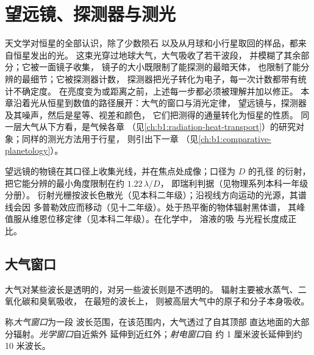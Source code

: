 \chapter{望远镜、探测器与测光}\label{ch:b1:observing-the-sky}

天文学对恒星的全部认识，除了少数陨石
以及从月球和小行星取回的样品，都来自恒星发出的光。
这束光穿过地球大气，大气吸收了若干波段，
并模糊了其余部分；它被一面镜子收集，
镜子的大小既限制了能探测的最暗天体，
也限制了能分辨的最细节；它被探测器计数，
探测器把光子转化为电子，每一次计数都带有统计不确定度。
在亮度变为或距离之前，上述每一步都必须被理解并加以修正。
本章沿着光从恒星到数值的路径展开：大气的窗口与消光定律，
望远镜与，探测器及其噪声，然后是星等、视差和颜色，
它们把测得的通量转化为恒星的性质。
同一层大气从下方看，是气候各章
（见\cref{ch:b1:radiation-heat-transport}）的研究对象；同样的测光方法用于行星，
则引出下一章
（见\cref{ch:b1:comparative-planetology}）。

\begin{recall}
望远镜的物镜在其口径上收集光线，并在焦点处成像；口径为 $D$ 的孔径
的衍射，把它能分辨的最小角度限制在约 $1.22\,\lambda/D$，
即瑞利判据（见物理系列本科一年级分册）。
衍射光栅按波长色散光（见本科二年级）；沿视线方向运动的光源，其谱线会因
多普勒效应而移动（见十二年级）。处于热平衡的物体辐射黑体谱，
其峰值服从维恩位移定律（见本科二年级）。在化学中，
溶液的吸
与光程长度成正比。
\end{recall}

\section{大气窗口}

大气对某些波长是透明的，对另一些波长则是不透明的。
辐射主要被水蒸气、二氧化碳和臭氧吸收，
在最短的波长上，
则被高层大气中的原子和分子本身吸收。

\begin{definition}[大气窗口]\label{def:b1:observing-the-sky:window}
称\emph{大气窗口}为一段
波长范围，在该范围内，大气透过了自其顶部
直达地面的大部分辐射。\emph{光学窗口}自近紫外
延伸到近红外；\emph{射电窗口}自
约 1 厘米波长延伸到约 10 米波长。
\end{definition}

